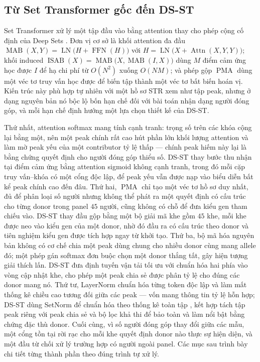 \documentclass[12pt,a4paper]{article}
\begin{document}
\subsection{Từ Set Transformer gốc đến DS-ST}

Set Transformer xử lý một tập đầu vào bằng attention thay cho phép cộng cố định của Deep Sets \cite{lee2019,zaheer2017}. Đơn vị cơ sở là khối attention đa đầu \(\operatorname{MAB}(X,Y)=\operatorname{LN}\!\big(H+\operatorname{FFN}(H)\big)\) với \(H=\operatorname{LN}\!\big(X+\operatorname{Attn}(X,Y,Y)\big)\); khối induced \(\operatorname{ISAB}(X)=\operatorname{MAB}\!\big(X,\operatorname{MAB}(I,X)\big)\) dùng \(M\) điểm cảm ứng học được \(I\) để hạ chi phí từ \(O(N^2)\) xuống \(O(NM)\); và phép gộp \(\operatorname{PMA}\) dùng một véc tơ truy vấn học được để biến tập thành một véc tơ bất biến hoán vị. Kiến trúc này phù hợp tự nhiên với một hồ sơ STR xem như tập peak, nhưng ở dạng nguyên bản nó bộc lộ bốn hạn chế đối với bài toán nhận dạng người đóng góp, và mỗi hạn chế định hướng một lựa chọn thiết kế của DS-ST.

Thứ nhất, attention softmax mang tính cạnh tranh: trọng số trên các khóa cộng lại bằng một, nên một peak chính rất cao hút phần lớn khối lượng attention và làm mờ peak yếu của một contributor tỷ lệ thấp — chính peak hiếm này lại là bằng chứng quyết định cho người đóng góp thiểu số. DS-ST thay bước thu nhận tại điểm cảm ứng bằng attention sigmoid không cạnh tranh, trong đó mỗi cặp truy vấn–khóa có một cổng độc lập, để peak yếu vẫn được nạp vào biểu diễn bất kể peak chính cao đến đâu. Thứ hai, \(\operatorname{PMA}\) chỉ tạo một véc tơ hồ sơ duy nhất, đủ để phân loại số người nhưng không thể phát ra một quyết định có cấu trúc cho từng donor trong panel \(45\) người, cũng không có chỗ để đưa kiểu gen tham chiếu vào. DS-ST thay đầu gộp bằng một bộ giải mã khe gồm \(45\) khe, mỗi khe được neo vào kiểu gen của một donor, nhờ đó đầu ra có cấu trúc theo donor và tiên nghiệm kiểu gen được tích hợp ngay từ khởi tạo. Thứ ba, bộ mã hóa nguyên bản không có cơ chế chia một peak dùng chung cho nhiều donor cùng mang allele đó; một phép gán softmax đơn buộc chọn một donor thắng tất, gây hiện tượng giải thích lấn. DS-ST đưa định tuyến vận tải tối ưu với chuẩn hóa hai phía vào vòng cập nhật khe, cho phép một peak chia sẻ được phân tỷ lệ cho đúng các donor mang nó. Thứ tư, LayerNorm chuẩn hóa từng token độc lập và làm mất thống kê chiều cao tương đối giữa các peak — vốn mang thông tin tỷ lệ hỗn hợp; DS-ST dùng SetNorm để chuẩn hóa theo thống kê toàn tập \cite{zhang2023setnorm}, kết hợp tách tập peak riêng với peak chia sẻ và bộ lọc khả thi để bảo toàn và làm nổi bật bằng chứng đặc thù donor. Cuối cùng, vì số người đóng góp thay đổi giữa các mẫu, một cổng tồn tại rời rạc cho mỗi khe quyết định donor nào thực sự hiện diện, và một đầu từ chối xử lý trường hợp có người ngoài panel. Các mục sau trình bày chi tiết từng thành phần theo đúng trình tự xử lý.
\end{document}
